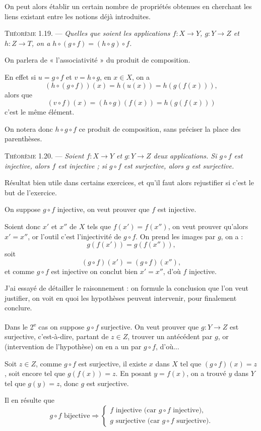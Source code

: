 On peut alors établir un certain nombre de propriétés obtenues en cherchant les liens existant entre les notions déjà introduites.

\medskip\noindent\textsc{Théorème 1.19.} --- \emph{Quelles que soient les applications $f:X\to Y$, $g:Y\to Z$ et $h:Z\to T$, on a $h\circ(g\circ f)=(h\circ g)\circ f$.}

On parlera de « l'associativité » du produit de composition.

En effet si $u=g\circ f$ et $v=h\circ g$, en $x\in X$, on a
\[
(h\circ(g\circ f))(x)=h(u(x))=h(g(f(x))),
\]
alors que
\[
(v\circ f)(x)=(h\circ g)(f(x))=h(g(f(x)))
\]
c'est le même élément. \bookend

On notera donc $h\circ g\circ f$ ce produit de composition, sans préciser la place des parenthèses.

\medskip\noindent\textsc{Théorème 1.20.} --- \emph{Soient $f:X\to Y$ et $g:Y\to Z$ deux applications. Si $g\circ f$ est injective, alors $f$ est injective ; si $g\circ f$ est surjective, alors $g$ est surjective.}

Résultat bien utile dans certains exercices, et qu'il faut alors rejustifier si c'est le but de l'exercice.

On suppose $g\circ f$ injective, on veut prouver que $f$ est injective.

Soient donc $x'$ et $x''$ de $X$ tels que $f(x')=f(x'')$, on veut prouver qu'alors $x'=x''$, or l'outil c'est l'injectivité de $g\circ f$. On prend les images par $g$, on a :
\[
g(f(x'))=g(f(x'')),
\]
soit
\[
(g\circ f)(x')=(g\circ f)(x''),
\]
et comme $g\circ f$ est injective on conclut bien $x'=x''$, d'où $f$ injective.

J'ai essayé de détailler le raisonnement : on formule la conclusion que l'on veut justifier, on voit en quoi les hypothèses peuvent intervenir, pour finalement conclure.

Dans le 2\textsuperscript{e} cas on suppose $g\circ f$ surjective. On veut prouver que $g:Y\to Z$ est surjective, c'est-à-dire, partant de $z\in Z$, trouver un antécédent par $g$, or (intervention de l'hypothèse) on en a un par $g\circ f$, d'où...

Soit $z\in Z$, comme $g\circ f$ est surjective, il existe $x$ dans $X$ tel que $(g\circ f)(x)=z$, soit encore tel que $g(f(x))=z$. En posant $y=f(x)$, on a trouvé $y$ dans $Y$ tel que $g(y)=z$, donc $g$ est surjective. \bookend

Il en résulte que
\[
g\circ f\text{ bijective}\Rightarrow
\begin{cases}
f\text{ injective (car }g\circ f\text{ injective),}\\
g\text{ surjective (car }g\circ f\text{ surjective).}
\end{cases}
\]

